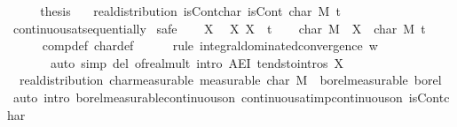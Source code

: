 \documentclass[leqno]{article}
\theoremstyle{definition}
\begin{document}
\begin{isabellebody}
\ \ \isamarkupfalse%
\ \isamarkupfalse%
\ {\isacharquery}thesis\ \isacommand{{\isachardot}}\isamarkupfalse%
\isanewline
{}
\isamarkupfalse%
\ {\isacharparenleft}\ real{\isacharunderscore}distribution{\isacharparenright}\ isCont{\isacharunderscore}char{\isacharcolon}\ {\isachardoublequoteopen}isCont\ {\isacharparenleft}char\ M{\isacharparenright}\ t{\isachardoublequoteclose}\isanewline
{}\isamarkupfalse%
\ continuous{\isacharunderscore}at{\isacharunderscore}sequentially\isanewline
{}\isamarkupfalse%
\ safe\isanewline
\ \ \isamarkupfalse%
\ X\ \isamarkupfalse%
\ X{\isacharcolon}\ {\isachardoublequoteopen}X\ {\isacharminus}{\isacharminus}{\isacharminus}{\isacharminus}{\isachargreater}\ t{\isachardoublequoteclose}\isanewline
\ \ \isamarkupfalse%
\ {\isachardoublequoteopen}{\isacharparenleft}char\ M\ {\isasymcirc}\ X{\isacharparenright}\ {\isacharminus}{\isacharminus}{\isacharminus}{\isacharminus}{\isachargreater}\ char\ M\ t{\isachardoublequoteclose}\isanewline
\ \ \ \ \isamarkupfalse%
\ comp{\isacharunderscore}def\ char{\isacharunderscore}def\isanewline
\ \ \ \ \isamarkupfalse%
\ {\isacharparenleft}rule\ integral{\isacharunderscore}dominated{\isacharunderscore}convergence{\isacharbrackleft}\ w{\isacharequal}{\isachardoublequoteopen}{\isasymlambda}{\isacharunderscore}{\isachardot}\ {}{\isachardoublequoteclose}{\isacharbrackright}{\isacharparenright}\isanewline
\ \ \ \ \ \ \ {\isacharparenleft}auto\ simp\ del{\isacharcolon}\ of{\isacharunderscore}real{\isacharunderscore}mult\ intro{\isacharbang}{\isacharcolon}\ AE{\isacharunderscore}I{}\ tendsto{\isacharunderscore}intros\ X{\isacharparenright}\isanewline
{}
\isamarkupfalse%
\ {\isacharparenleft}\ real{\isacharunderscore}distribution{\isacharparenright}\ char{\isacharunderscore}measurable\ {\isacharbrackleft}measurable{\isacharbrackright}{\isacharcolon}\ {\isachardoublequoteopen}char\ M\ {\isasymin}\ borel{\isacharunderscore}measurable\ borel{\isachardoublequoteclose}\isanewline
{}\isamarkupfalse%
\ {\isacharparenleft}auto\ intro{\isacharbang}{\isacharcolon}\ borel{\isacharunderscore}measurable{\isacharunderscore}continuous{\isacharunderscore}on{}\ continuous{\isacharunderscore}at{\isacharunderscore}imp{\isacharunderscore}continuous{\isacharunderscore}on\ isCont{\isacharunderscore}char{\isacharparenright}%
\end{isabellebody}
\end{document}
